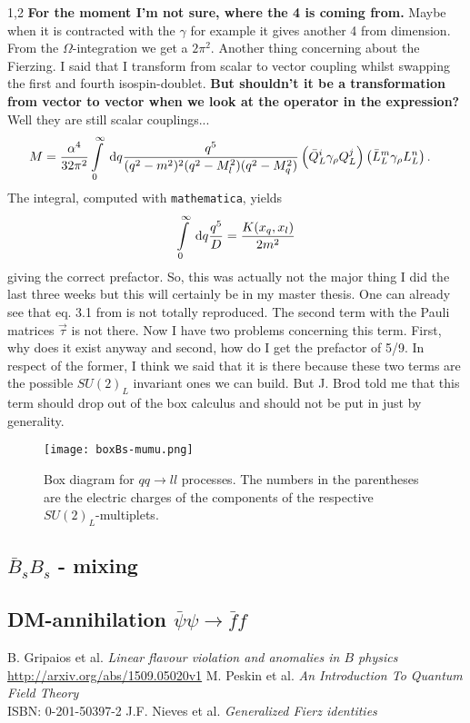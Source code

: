 \documentclass[11pt,a4paper,twoside]{article}
\begin{document}
\begin{spacing}{1,2}
\textbf{For the moment I'm not sure, where the 4 is coming from.} Maybe when it is contracted with the $\gamma$ for example it gives another 4 from dimension.
From the $\Omega$-integration we get a $2\pi^2$. Another thing concerning about the Fierzing. I said that I transform from scalar to vector coupling whilst
swapping the first and fourth isospin-doublet. \textbf{But shouldn't it be a transformation from vector to vector when we look at the operator in the expression?}
Well they are still scalar couplings... 
\begin{align}
 M &= \frac{\alpha^4}{32\pi^2} \int\limits_0^\infty \; \mathrm{d} q \frac{q^5}{(q^2-m^2)^2(q^2-M_l^2)(q^2-M_q^2)} \left(\bar Q_L^i \gamma_\rho Q_L^j\right)\left(\bar L_L^m \gamma_\rho L_L^n\right).
\end{align}
The integral, computed with \texttt{mathematica}, yields
\begin{align}
 \int \limits_0^\infty \; \mathrm{d} q \frac{q^5}{D} = \frac{K(x_q,x_l)}{2m^2}
\end{align}
giving the correct prefactor. So, this was actually not the major thing I did the last three weeks but this will certainly be in my master thesis. 
One can already see that eq. 3.1 from \cite{Grip} is not totally reproduced. The second term with the Pauli matrices $\vec \tau$ is not there.
Now I have two problems concerning this term. First, why does it exist anyway and second, how do I get the prefactor of 5/9. In respect of the former, I think
we said that it is there because these two terms are the possible $SU(2)_L$ invariant ones we can build. But J. Brod told me that this term should drop out 
of the box calculus and should not be put in just by generality. 

\begin{figure}[t]
 \texttt{[image: boxBs-mumu.png]}
 \caption{Box diagram for $qq\rightarrow ll$ processes. The numbers in the parentheses are the electric charges of the components of the respective $SU(2)_L$-multiplets.}
 \label{pic_boxqqll}
\end{figure}


\subsection{$\bar B_s B_s$ - mixing}
\subsection{DM-annihilation $\bar \psi\psi \rightarrow \bar f f$ }



\newpage
\end{spacing}
\newpage
\begin{thebibliography}{xxx}
 B. Gripaios et al. \textit{Linear flavour violation and anomalies in $B$ physics}\\ \href{http://arxiv.org/abs/1509.05020v1}{http://arxiv.org/abs/1509.05020v1}
 M. Peskin et al. \textit{An Introduction To Quantum Field Theory}\\ ISBN: 0-201-50397-2
 J.F. Nieves et al. \textit{Generalized Fierz identities}
\end{thebibliography}
\end{document}
